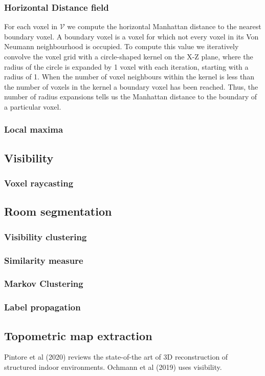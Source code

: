 \documentclass{article}
\begin{document}
    \subsubsection{Horizontal Distance field}
For each voxel in \(\mathcal{V}\) we compute the horizontal Manhattan distance to the nearest boundary voxel. A boundary voxel is a voxel for which not every voxel in its Von Neumann neighbourhood is occupied. To compute this value we iteratively convolve the voxel grid with a circle-shaped kernel on the X-Z plane, where the radius of the circle is expanded by 1 voxel with each iteration, starting with a radius of 1. When the number of voxel neighbours within the kernel is less than the number of voxels in the kernel a boundary voxel has been reached. Thus, the number of radius expansions tells us the Manhattan distance to the boundary of a particular voxel. 
    \subsubsection{Local maxima}

\subsection{Visibility}
    \subsubsection{Voxel raycasting}

\subsection{Room segmentation}
    \subsubsection{Visibility clustering}
    \subsubsection{Similarity measure}
    \subsubsection{Markov Clustering}
    \subsubsection{Label propagation}

\subsection{Topometric map extraction}


Pintore et al (2020) reviews the state-of-the art of 3D reconstruction of structured indoor environments. Ochmann et al (2019) uses visibility.
\end{document}
